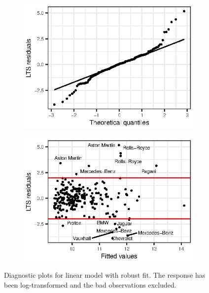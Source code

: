 \documentclass[titlepage]{article}
\begin{document}
\begin{figure}[!htb]
  \begin{subfigure}{0.5\linewidth}
    \includegraphics{q3-qq-rob}
    \label{fig:q3-qq-resp-rob}
  \end{subfigure}
  \begin{subfigure}{0.5\linewidth}
    \includegraphics{q3-resids-vs-fitted-rob}
    \label{fig:q3-resids-vs-fitted-rob}
  \end{subfigure}
  \caption{Diagnostic plots for linear model with robust fit. The response has been log-transformed and the bad observations excluded.}
\end{figure}
\restoregeometry
\end{document}
